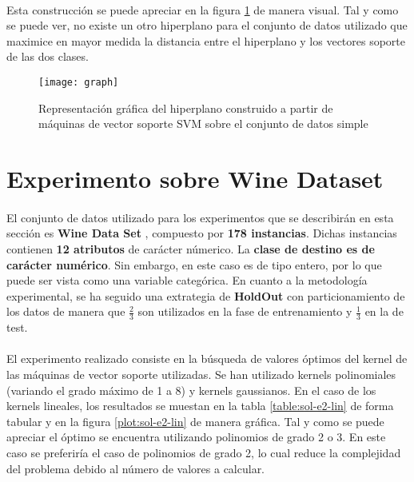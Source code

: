 \documentclass{article}
\begin{document}
		\paragraph{}
		Esta construcción se puede apreciar en la figura \ref{fig:e1-plot} de manera visual. Tal y como se puede ver, no existe un otro hiperplano para el conjunto de datos utilizado que maximice en mayor medida la distancia entre el hiperplano y los vectores soporte de las dos clases.

		\begin{figure}
			\begin{center}
				\texttt{[image: graph]}
			\end{center}
			\caption{Representación gráfica del hiperplano construido a partir de máquinas de vector soporte SVM sobre el conjunto de datos simple}
			\label{fig:e1-plot}
		\end{figure}


	\section{Experimento sobre Wine Dataset}
	\label{sec:e2}

		\paragraph{}
		El conjunto de datos utilizado para los experimentos que se describirán en esta sección es \textbf{Wine Data Set} \cite{dataset:wine}, compuesto por \textbf{178 instancias}. Dichas instancias contienen \textbf{12 atributos} de carácter númerico. La \textbf{clase de destino es de carácter numérico}. Sin embargo, en este caso es de tipo entero, por lo que puede ser vista como una variable categórica. En cuanto a la metodología experimental, se ha seguido una extrategia de \textbf{HoldOut} con particionamiento de los datos de manera que $\frac{2}{3}$ son utilizados en la fase de entrenamiento y $\frac{1}{3}$ en la de test.

		\paragraph{}
		El experimento realizado consiste en la búsqueda de valores óptimos del kernel de las máquinas de vector soporte utilizadas. Se han utilizado kernels polinomiales (variando el grado máximo de 1 a 8) y kernels gaussianos. En el caso de los kernels lineales, los resultados se muestan en la tabla \ref{table:sol-e2-lin} de forma tabular y en la figura \ref{plot:sol-e2-lin} de manera gráfica. Tal y como se puede apreciar el óptimo se encuentra utilizando polinomios de grado 2 o 3. En este caso se preferiría el caso de polinomios de grado 2, lo cual reduce la complejidad del problema debido al número de valores a calcular.
\end{document}
